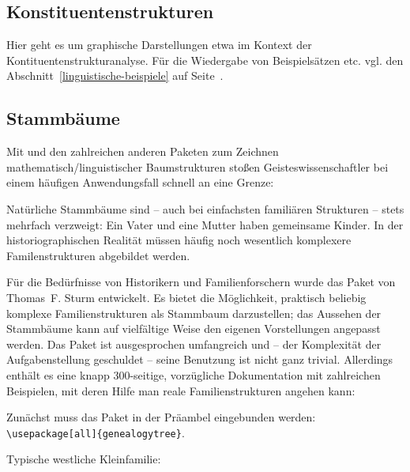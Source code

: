 \subsection{Konstituentenstrukturen}
\label{linguistische-strukturen}
   
 


Hier geht es um graphische Darstellungen etwa im Kontext der Kontituentenstrukturanalyse.
Für die Wiedergabe von Beispielsätzen etc. vgl. den Abschnitt~\ref{linguistische-beispiele} auf Seite~\pageref{linguistische-beispiele}.






\subsection{Stammbäume}
 

Mit  und den zahlreichen anderen Paketen zum Zeichnen mathematisch/linguistischer
Baumstrukturen stoßen Geisteswissenschaftler bei einem häufigen Anwendungsfall schnell an eine
Grenze:

Natürliche Stammbäume sind -- auch bei einfachsten familiären Strukturen -- stets mehrfach
verzweigt: Ein Vater und eine Mutter haben gemeinsame Kinder. 
In der historiographischen Realität müssen häufig noch wesentlich komplexere Familenstrukturen
abgebildet werden.

Für die Bedürfnisse von Historikern und Familienforschern wurde das Paket 
von Thomas~F. Sturm entwickelt.
Es bietet die Möglichkeit, praktisch beliebig komplexe Familienstrukturen als Stammbaum darzustellen;
das Aussehen der Stammbäume kann auf vielfältige Weise den eigenen Vorstellungen angepasst werden.
Das Paket ist ausgesprochen umfangreich und -- der Komplexität der Aufgabenstellung geschuldet --
seine Benutzung ist nicht ganz trivial.
Allerdings enthält es eine knapp 300-seitige, vorzügliche Dokumentation mit zahlreichen Beispielen,
mit deren Hilfe man reale Familienstrukturen  angehen kann:

Zunächst muss das Paket in der Präambel eingebunden werden:
\lstinline/\usepackage[all]{genealogytree}/.

Typische westliche Kleinfamilie:

\begin{lfgwexample}{}
\end{lfgwexample}



